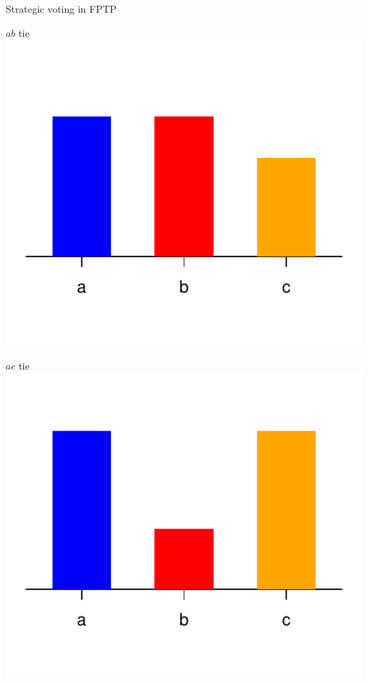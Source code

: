 \documentclass[10pt, en-GB]{beamer}
\begin{document}
\begin{frame}{Strategic voting in FPTP}
\begin{minipage}{.33\textwidth}
\centering $ab$ tie \\ 
\includegraphics[width=\textwidth]{pres_fig/cases_for_paper/plurality_ties_for_first_1.pdf}
\end{minipage}%
\begin{minipage}{.33\textwidth}
\centering $ac$ tie \\ 
\includegraphics[width=\textwidth]{pres_fig/cases_for_paper/plurality_ties_for_first_2.pdf}

\end{minipage}
\end{frame}
\end{document}
